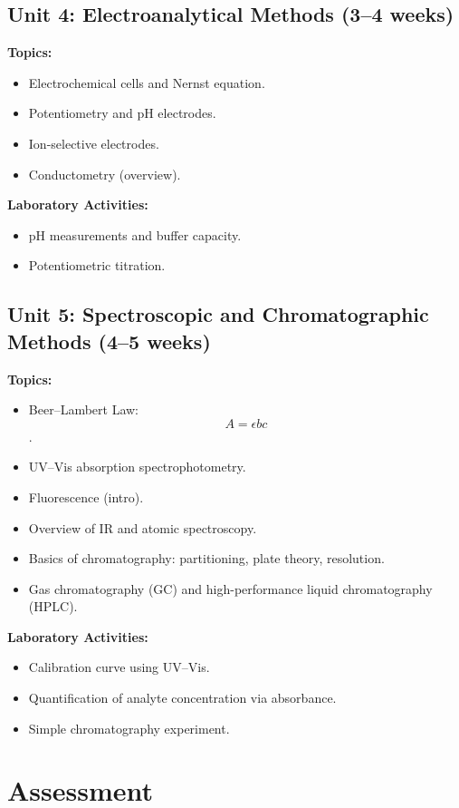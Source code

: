 \documentclass[12pt,oneside]{book}
\begin{document}
\subsection{Unit 4: Electroanalytical Methods (3--4 weeks)}

\textbf{Topics:}
\begin{itemize}
    \item Electrochemical cells and Nernst equation.
    \item Potentiometry and pH electrodes.
    \item Ion-selective electrodes.
    \item Conductometry (overview).
\end{itemize}

\textbf{Laboratory Activities:}
\begin{itemize}
    \item pH measurements and buffer capacity.
    \item Potentiometric titration.
\end{itemize}

\subsection{Unit 5: Spectroscopic and Chromatographic Methods (4--5 weeks)}

\textbf{Topics:}
\begin{itemize}
    \item Beer–Lambert Law: \[A = \epsilon b c\].
    \item UV–Vis absorption spectrophotometry.
    \item Fluorescence (intro).
    \item Overview of IR and atomic spectroscopy.
    \item Basics of chromatography: partitioning, plate theory, resolution.
    \item Gas chromatography (GC) and high-performance liquid chromatography (HPLC).
\end{itemize}

\textbf{Laboratory Activities:}
\begin{itemize}
    \item Calibration curve using UV–Vis.
    \item Quantification of analyte concentration via absorbance.
    \item Simple chromatography experiment.
\end{itemize}

\section{Assessment}
\end{document}
